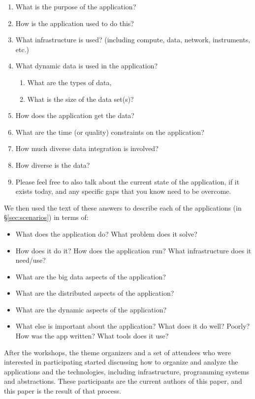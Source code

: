 \documentclass[times]{cpeauth}
\begin{document}
\begin{enumerate}
\item What is the purpose of the application?
\item How is the application used to do this?
\item What infrastructure is used? (including compute, data, network,
instruments, etc.)
\item What dynamic data is used in the application?
\begin{enumerate}
\item What are the types of data,
\item What is the size of the data set(s)?
\end{enumerate}
\item How does the application get the data?
\item What are the time (or quality) constraints on the application?
\item How much diverse data integration is involved?
\item How diverse is the data?
\item Please feel free to also talk about the current state of the application,
if it exists today, and any specific gaps that you know need to be overcome.
\end{enumerate}

We then used the text of these answers to describe each of the applications (in
\S\ref{sec:scenarios}) in terms of:

\begin{itemize}
\item What does the application do? What problem does it solve?
\item How does it do it? How does the application run?  What infrastructure does
it need/use?
\item What are the big data aspects of the application?
\item What are the distributed aspects of the application?
\item What are the dynamic aspects of the application?
\item What else is important about the application?  What does it do well?
Poorly? How was the app written? What tools does it use?
\end{itemize}

After the workshops, the theme organizers and a set of attendees who were
interested in participating started discussing how to organize and analyze the
applications and the technologies, including infrastructure, programming systems
and abstractions.  These participants are the current authors of this paper, and
this paper is the result of that process.
\end{document}

